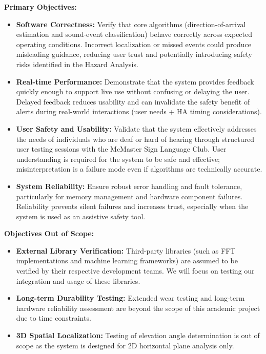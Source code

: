 \documentclass[12pt, titlepage]{article}
\begin{document}
\textbf{Primary Objectives:}
\begin{itemize}
    \item \textbf{Software Correctness:} Verify that core algorithms 
    (direction-of-arrival estimation and sound-event classification) behave 
    correctly across expected operating conditions. Incorrect localization or 
    missed events could produce misleading guidance, reducing user trust and 
    potentially introducing safety risks identified in the Hazard Analysis.
    
    \item \textbf{Real-time Performance:} Demonstrate that the system provides 
    feedback quickly enough to support live use without confusing or delaying 
    the user. Delayed feedback reduces usability and can invalidate the safety 
    benefit of alerts during real-world interactions (user needs + HA timing 
    considerations).
    
    \item \textbf{User Safety and Usability:} Validate that the system
    effectively addresses the needs of individuals who are deaf or hard of
    hearing through structured user testing sessions with the McMaster Sign
    Language Club. User understanding is required for the system to be safe and
    effective; misinterpretation is a failure mode even if algorithms are 
    technically accurate.
    
    \item \textbf{System Reliability:} Ensure robust error handling and fault
    tolerance, particularly for memory management and hardware component
    failures. Reliability prevents silent failures and increases trust, 
    especially when the system is used as an assistive safety tool.
\end{itemize}

\textbf{Objectives Out of Scope:}
\begin{itemize}
    \item \textbf{External Library Verification:} Third-party libraries (such as
    FFT implementations and machine learning frameworks) are assumed to be
    verified by their respective development teams. We will focus on testing our
    integration and usage of these libraries.
    
    \item \textbf{Long-term Durability Testing:} Extended wear testing and
    long-term hardware reliability assessment are beyond the scope of this
    academic project due to time constraints.
        
    \item \textbf{3D Spatial Localization:} Testing of elevation angle
    determination is out of scope as the system is designed for 2D horizontal
    plane analysis only.
\end{itemize}
\end{document}
